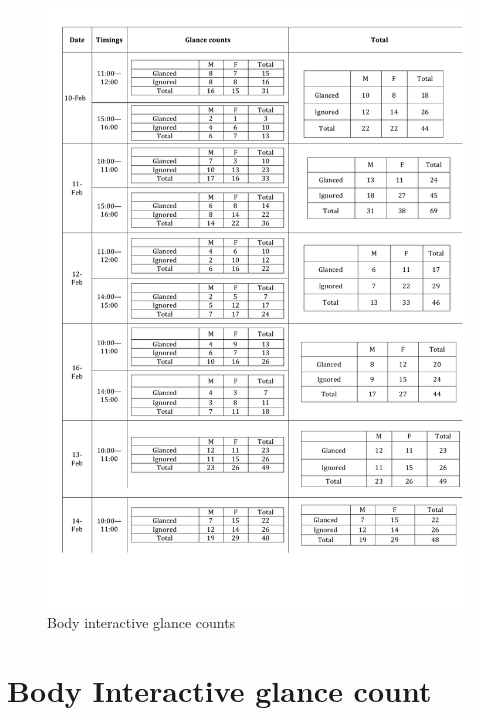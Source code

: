 \begin{appendices}
\begin{figure}[H]
 \centering 
    \includegraphics[width=\textwidth,height=0.8\textheight]{Appendices/8/body-interactive/body-interactive_glances.pdf}
    \caption{Body interactive glance counts}
     \label{app:body-interactive-glancecount}%
\end{figure}



\section{Body Interactive glance count}


\end{appendices}
